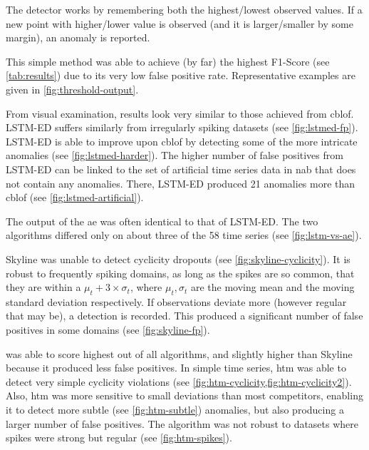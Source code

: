 \begin{description}[style=unboxed,leftmargin=0cm]
    The detector works by remembering both the highest/lowest observed values. If a
    new point with higher/lower value is observed (and it is larger/smaller by some
    margin), an anomaly is reported.

    This simple method was able to achieve (by far) the highest F1-Score (see
    \cref{tab:results}) due to its very low false positive rate. Representative
    examples are given in \cref{fig:threshold-output}.
    \item[LSTM-ED] From visual examination, results look very similar to those
    achieved from \gls{cblof}. LSTM-ED suffers similarly from irregularly spiking
    datasets (see \cref{fig:lstmed-fp}). LSTM-ED is able to improve upon \gls{cblof}
    by detecting some of the more intricate anomalies (see \cref{fig:lstmed-harder}).
    The higher number of false positives from LSTM-ED can be linked to the set of
    artificial time series data in \gls{nab} that does not contain any anomalies.
    There, LSTM-ED produced 21 anomalies more than \gls{cblof} (see \cref{fig:lstmed-artificial}).
    \item[Autoencoder] The output of the \gls{ae} was often identical to that of LSTM-ED\@.
    The two algorithms differed only on about three of the 58 time series
    (see \cref{fig:lstm-vs-ae}).
    \item[Skyline] Skyline was unable to detect cyclicity dropouts (see \cref{fig:skyline-cyclicity}).
    It is robust to frequently spiking domains, as long as the spikes are so common,
    that they are within a \(\mu_t + 3 \times \sigma_t\), where \(\mu_t, \sigma_t\)
    are the moving mean and the moving standard deviation respectively.
    If observations deviate more (however regular that may be), a detection is recorded.
    This produced a significant number of false positives in some domains (see \cref{fig:skyline-fp}).
    \item[Numenta HTM] was able to score highest out of all algorithms,
    and slightly higher than Skyline because it produced less false positives. In simple
    time series, \gls{htm} was able to detect very simple cyclicity violations
    (see \cref{fig:htm-cyclicity,fig:htm-cyclicity2}). Also, \gls{htm} was more
    sensitive to small deviations than most competitors, enabling it to detect
    more subtle (see \cref{fig:htm-subtle}) anomalies, but also producing a larger number of false positives.
    The algorithm was not robust to datasets where spikes were strong but regular
    (see \cref{fig:htm-spikes}).
\end{description}

